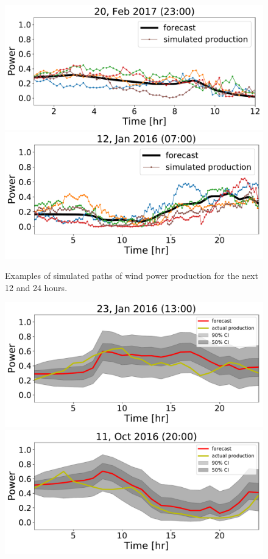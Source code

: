 \documentclass[ima, 20pt, portrait, plainboxedsections]{sciposter}
\begin{document}
\begin{multicols}{3}
\begin{figure}[t]
\begin{center}
   \includegraphics[width=0.8\linewidth]{simulated/12hr/1124.pdf}
   \includegraphics[width=0.8\linewidth]{simulated/24hr/19.pdf}  %
\end{center}
   \caption{ Examples of simulated paths of wind power production for the next 12 and 24 hours.}
\label{simulated_24hr}
\end{figure}


\begin{figure}[t]
\begin{center}
  \includegraphics[width=0.8\linewidth]{confidence_intervals/24hr/31.pdf}
  \includegraphics[width=0.8\linewidth]{confidence_intervals/24hr/820.pdf}


\end{center}
\end{figure}
\end{multicols}
\end{document}
